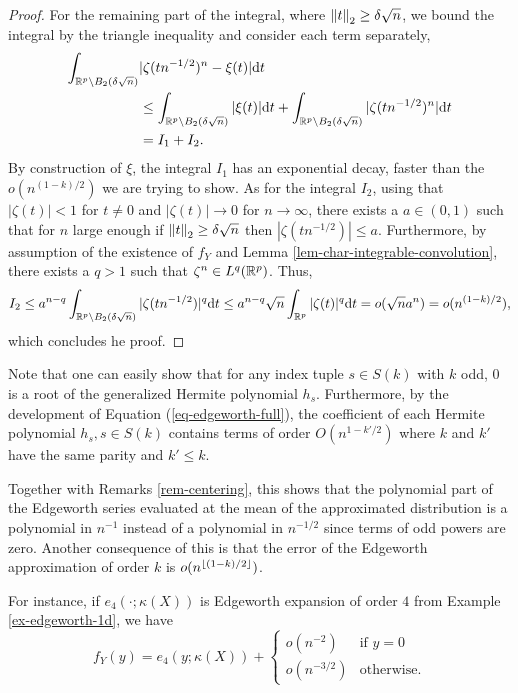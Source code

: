 \begin{proof}
    For the remaining part of the integral, where $\norm{t}_2 \geq \delta \sqrt{n}$, we bound the integral by the triangle inequality and consider each term separately,
    \begin{align*}
        \int_{\Rp \setminus B_2(\delta\sqrt{n})} &|\zeta(tn^{-1/2})^n - \xi(t)| \d t \\
        &\leq \int_{\Rp \setminus B_2(\delta\sqrt{n})} |\xi(t)| \d t + \int_{\Rp \setminus B_2(\delta\sqrt{n})} |\zeta(tn^{-1/2})^n| \d t\\
        &= I_1 + I_2.
    \end{align*}
    By construction of $\xi$, the integral $I_1$ has an exponential decay, faster than the $o(n^{(1 - k)/2})$ we are trying to show. As for the integral $I_2$, using that $|\zeta(t)| < 1$ for $t \neq 0$ and $|\zeta(t)| \rightarrow 0$ for $n \rightarrow \infty$, there exists a $a \in (0, 1)$ such that for $n$ large enough if $\norm{t}_2 \geq \delta\sqrt{n}$ then $|\zeta(tn^{-1/2})| \leq a$. Furthermore, by assumption of the existence of $f_Y$ and Lemma \ref{lem-char-integrable-convolution}, there exists a $q > 1$ such that $\zeta^n \in L^q(\Rp)$. Thus,
    \begin{equation*}
        I_2
        \leq a^{n-q} \int_{\Rp \setminus B_2(\delta\sqrt{n})} |\zeta(tn^{-1/2})|^q \d t 
        \leq a^{n-q}\sqrt{n}\intRp{t}{|\zeta(t)|^q} 
        = o(\sqrt{n}a^n) = o(n^{(1-k)/2}),
    \end{equation*}
    which concludes he proof.
\end{proof}

\begin{remark} \label{rem-edge-mean}
    Note that one can easily show that for any index tuple $s \in S(k)$ with $k$ odd, 0 is a root of the generalized Hermite polynomial $h_s$. 
    Furthermore, by the development of Equation (\ref{eq-edgeworth-full}), the coefficient of each Hermite polynomial $h_s, s \in S(k)$ contains terms of order $O(n^{1-k'/2})$ where $k$ and $k'$ have the same parity and $k' \leq k$.

    Together with Remarks \ref{rem-centering}, this shows that the polynomial part of the Edgeworth series evaluated at the mean of the approximated distribution is a polynomial in $n^{-1}$ instead of a polynomial in $n^{-1/2}$ since terms of odd powers are zero. Another consequence of this is that the error of the Edgeworth approximation of order $k$ is $o(n^{\floor{(1-k)/2}})$. 
    
    For instance, if $e_4(\cdot; \kappa(X))$ is Edgeworth expansion of order $4$ from Example \ref{ex-edgeworth-1d}, we have
    \begin{equation*}
        f_Y(y) = e_4(y; \kappa(X)) + \begin{cases}
            o(n^{-2}) &\text{if } y = 0\\
            o(n^{-3/2}) &\text{otherwise}.
        \end{cases} 
    \end{equation*} 
\end{remark}


